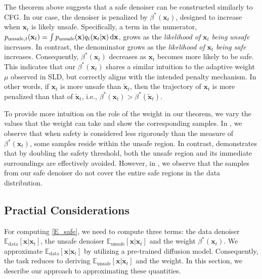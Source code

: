 %
%
%
%
%
%
%
%
%
%
%
%

The theorem above suggests that a safe denoiser can be constructed similarly to CFG. 
%
%
In our case, the denoiser is penalized by $\beta^{*}(\mathbf{x}_{t})$, designed to increase when $\mathbf{x}_{t}$ is likely unsafe. Specifically, a term in the numerator, $p_{\text{unsafe},t}(\mathbf{x}_{t})=\int p_{\text{unsafe}}(\mathbf{x}) q_{t}(\mathbf{x}_{t} \vert \mathbf{x})\mathop{}\!\mathrm{d}\mathbf{x}$, grows as the \textit{likelihood of} $\mathbf{x}_{t}$ \textit{being unsafe} increases. In contrast, the denominator grows as the \textit{likelihood of} $\mathbf{x}_{t}$ \textit{being safe} increases. Consequently, $\beta^{*}(\mathbf{x}_{t})$ decreases as $\mathbf{x}_{t}$ becomes more likely to be safe. This indicates that our $\beta^{*}(\mathbf{x}_{t})$ shares a similar intuition to the adaptive weight $\mu$ observed in SLD, but correctly aligns with the intended penalty mechanism. In other words, if $\mathbf{x}_{t}$ is more unsafe than $\mathbf{\tilde{x}}_{t}$, then the trajectory of $\mathbf{x}_{t}$ is more penalized than that of $\mathbf{\tilde{x}}_{t}$, i.e., $\beta^{*}(\mathbf{x}_{t})>\beta^{*}(\mathbf{\tilde{x}}_{t})$.

To provide more intuition on the role of the weight in our theorem, we vary the values that the weight can take and show the corresponding samples. In , we observe that when safety is considered less rigorously than the measure of $\beta{^*}(\mathbf{x}_{t})$, some samples reside within the unsafe region. In contrast,  demonstrates that by doubling the safety threshold, both the unsafe region and its immediate surroundings are effectively avoided.
However, in , we observe that the samples from our safe denoiser do not cover the entire safe regions in the data distribution. 

\subsection{Practial Considerations}
\label{sec:unbiased}

For computing \eqref{E_safe}, we need to compute three terms: the data denoiser $\mathbb{E}_{\text{data}}[\mathbf{x}\vert\mathbf{x}_{t}]$, the unsafe denoiser $\mathbb{E}_{\text{unsafe}}[\mathbf{x}\vert\mathbf{x}_{t}]$ and the weight $\beta^{*}(\mathbf{x}_{t})$. We approximate $\mathbb{E}_{\text{data}}[\mathbf{x}\vert\mathbf{x}_{t}]$ by utilizing a pre-trained diffusion model. Consequently, the task reduces to deriving $\mathbb{E}_{\text{unsafe}}[\mathbf{x}\vert\mathbf{x}_{t}]$ and the weight. In this section, we describe our approach to approximating these quantities. 


